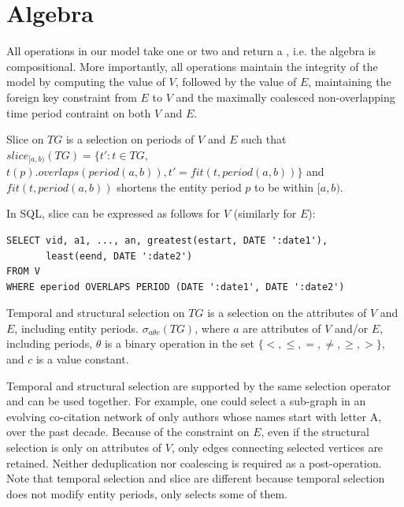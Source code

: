 \section{Algebra}
\label{sec:algebra}

All operations in our model take one or two \tgs and return a \tg,
i.e. the algebra is compositional.  More importantly, all operations
maintain the integrity of the model by computing the value of $V$,
followed by the value of $E$, maintaining the foreign key constraint
from $E$ to $V$ and the maximally coalesced non-overlapping time
period contraint on both $V$ and $E$.

\begin{definition}[Slice]
Slice on $TG$ is a selection on periods of $V$ and $E$ such that
$slice_{[a,b)}(TG) = \{t': t \in TG$, $t(p).overlaps(period(a,b)), t'
  = fit(t, period(a,b))\}$ and $fit(t, period(a,b))$ shortens the
  entity period $p$ to be within $[a,b)$.
\label{def:slice}
\end{definition}

In SQL, slice can be expressed as follows for $V$
(similarly for $E$):

\begin{small}
\begin{verbatim}
SELECT vid, a1, ..., an, greatest(estart, DATE ':date1'), 
       least(eend, DATE ':date2')
FROM V
WHERE eperiod OVERLAPS PERIOD (DATE ':date1', DATE ':date2')
\end{verbatim}
\end{small}

\begin{definition}[Selection]
Temporal and structural selection on $TG$ is a selection on the
attributes of $V$ and $E$, including entity periods.  $\sigma_{a
  \theta c}(TG)$, where $a$ are attributes of $V$ and/or $E$,
including periods, $\theta$ is a binary operation in the set $\{<,
\leq, =, \neq, \geq, >\}$, and $c$ is a value constant.
\label{def:selection}
\end{definition}

Temporal and structural selection are supported by the same selection
operator and can be used together.  For example, one could select a
sub-graph in an evolving co-citation network of only authors whose
names start with letter A, over the past decade.  Because of the
constraint on $E$, even if the structural selection is only on
attributes of $V$, only edges connecting selected vertices are
retained.  Neither deduplication nor coalescing is required as a
post-operation.  Note that temporal selection and slice are different
because temporal selection does not modify entity periods, only
selects some of them.

